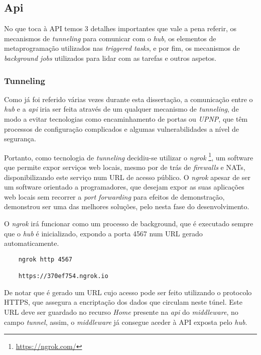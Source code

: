 \subsection{Api}

No que toca à API temos 3 detalhes importantes que vale a pena referir, os mecanismos de \textit{tunneling} para comunicar com o \textit{hub}, os elementos de metaprogramação utilizados nas \textit{triggered tasks}, e por fim, os mecanismos de \textit{background jobs} utilizados para lidar com as tarefas e outros aspetos.

\subsubsection{Tunneling}

Como já foi referido várias vezes durante esta dissertação, a comunicação entre o \textit{hub} e a \textit{api} iria ser feita através de um qualquer mecanismo de \textit{tunneling}, de modo a evitar tecnologias como encaminhamento de portas ou \textit{UPNP}, que têm processos de configuração complicados e algumas vulnerabilidades a nível de segurança.

Portanto, como tecnologia de \textit{tunneling} decidiu-se utilizar o \textit{ngrok} \footnote{\url{https://ngrok.com/}}, um software que permite expor serviços web locais, mesmo por de trás de \textit{firewalls} e NATs, disponibilizando este serviço num URL de acesso público. O \textit{ngrok} apesar de ser um software orientado a programadores, que desejam expor as suas aplicações web locais sem recorrer a \textit{port forwarding} para efeitos de demonstração, demonstrou ser uma das melhores soluções, pelo nesta fase do desenvolvimento.

O \textit{ngrok} irá funcionar como um processo de background, que é executado sempre que o \textit{hub} é inicializado, expondo a porta 4567 num URL gerado automaticamente.

\begin{verbatim}
    ngrok http 4567

    https://370ef754.ngrok.io
\end{verbatim}

De notar que é gerado um URL cujo acesso pode ser feito utilizando o protocolo HTTPS, que assegura a encriptação dos dados que circulam neste túnel. Este URL deve ser guardado no recurso \textit{Home} presente na \textit{api} do \textit{middleware}, no campo \textit{tunnel}, assim, o \textit{middleware} já consegue aceder à API exposta pelo \textit{hub}.

